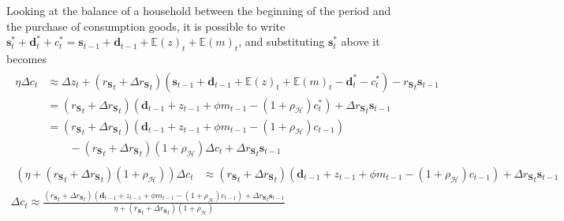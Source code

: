 \documentclass[a4paper, headings=standardclasses]{scrartcl}
\begin{document}
Looking at the balance of a household between the beginning of the period and the purchase of consumption goods, it is possible to write $\mathbf{s}^*_t + \mathbf{d}^*_t + c^*_t = \mathbf{s}_{t-1} + \mathbf{d}_{t-1} + {\mathbb{E}(z)}_t + {\mathbb{E}(m)}_t$, and substituting $\mathbf{s}^*_t$ above it becomes
\begin{gather*}
	\begin{align*}
		\eta {\Delta c}_t & \approx {\Delta z}_t   + ({r_\mathbf{S}}_t + {\Delta r_\mathbf{S}}_{t})(\mathbf{s}_{t-1} + \mathbf{d}_{t-1} + {\mathbb{E}(z)}_t + {\mathbb{E}(m)}_t - \mathbf{d}^*_t - c^*_t)- {r_\mathbf{S}}_{t} \mathbf{s}_{t-1} \\
		                  & = ({r_\mathbf{S}}_t + {\Delta r_\mathbf{S}}_{t})(\mathbf{d}_{t-1} + z_{t-1} + \phi m_{t-1} - (1+\rho_{\mathcal{H}}) c^*_t)              + {\Delta r_\mathbf{S}}_{t} \mathbf{s}_{t-1}                               \\
		                  & =  ({r_\mathbf{S}}_t + {\Delta r_\mathbf{S}}_{t})(\mathbf{d}_{t-1} + z_{t-1} + \phi m_{t-1} - (1+\rho_{\mathcal{H}}) c_{t-1})                                                                                      \\
		                  & \qquad - ({r_\mathbf{S}}_t + {\Delta r_\mathbf{S}}_{t})(1+\rho_{\mathcal{H}}) {\Delta c}_t + {\Delta r_\mathbf{S}}_{t} \mathbf{s}_{t-1}
	\end{align*}\\
	\begin{align*}
		(\eta + ({r_\mathbf{S}}_t + {\Delta r_\mathbf{S}}_{t})(1+\rho_{\mathcal{H}})) {\Delta c}_t & \approx ({r_\mathbf{S}}_t + {\Delta r_\mathbf{S}}_{t})(\mathbf{d}_{t-1} + z_{t-1} + \phi m_{t-1} - (1+\rho_{\mathcal{H}}) c_{t-1}) + {\Delta r_\mathbf{S}}_{t} \mathbf{s}_{t-1}
	\end{align*}\\
	{\Delta c}_t \approx \frac{({r_\mathbf{S}}_t + {\Delta r_\mathbf{S}}_{t})(\mathbf{d}_{t-1} + z_{t-1} + \phi m_{t-1} - (1+\rho_{\mathcal{H}}) c_{t-1}) + {\Delta r_\mathbf{S}}_{t} \mathbf{s}_{t-1}}{\eta +  ({r_\mathbf{S}}_t + {\Delta r_\mathbf{S}}_{t})(1+\rho_{\mathcal{H}})}
\end{gather*}
\end{document}
